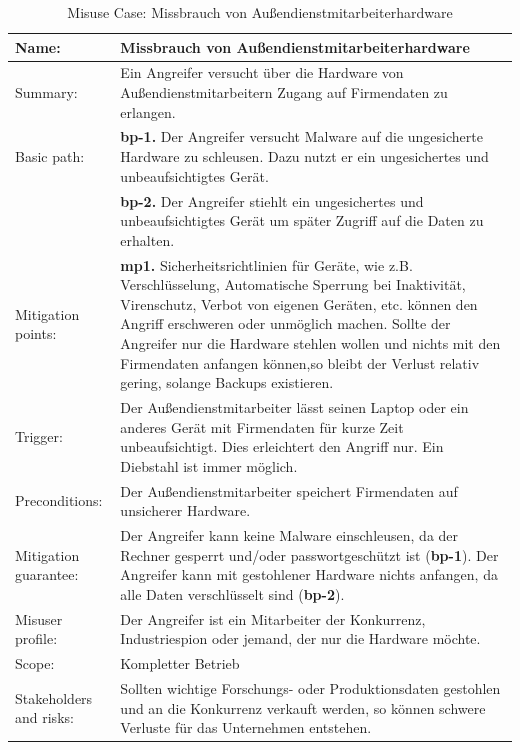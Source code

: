 \begin{table}[h]
\scriptsize
\centering
\caption{Misuse Case: Missbrauch von Außendienstmitarbeiterhardware}
\label{tab:MisuseCaseTemplate}
\begin{tabular}{p{}p{}}
\hline 
Name: & Missbrauch von Außendienstmitarbeiterhardware \\ 
\hline 
Summary: & Ein Angreifer versucht über die Hardware von Außendienstmitarbeitern Zugang auf Firmendaten zu erlangen.\\
\hline
Basic path: & \textbf{bp-1.} Der Angreifer versucht Malware auf die ungesicherte Hardware zu schleusen. Dazu nutzt er ein ungesichertes und unbeaufsichtigtes Gerät.\\
 & \textbf{bp-2.} Der Angreifer stiehlt ein ungesichertes und unbeaufsichtigtes Gerät um später Zugriff auf die Daten zu erhalten.\\ 
\hline 
Mitigation points: & \textbf{mp1.} Sicherheitsrichtlinien für Geräte, wie z.B. Verschlüsselung, Automatische Sperrung bei Inaktivität, Virenschutz, Verbot von eigenen Geräten, etc. können den Angriff erschweren oder unmöglich machen. Sollte der Angreifer nur die Hardware stehlen wollen und nichts mit den Firmendaten anfangen können,so bleibt der Verlust relativ gering, solange Backups existieren.\\ 
\hline 
Trigger: & Der Außendienstmitarbeiter lässt seinen Laptop oder ein anderes Gerät mit Firmendaten für kurze Zeit unbeaufsichtigt. Dies erleichtert den Angriff nur. Ein Diebstahl ist immer möglich.\\ 
\hline 
Preconditions: & Der Außendienstmitarbeiter speichert Firmendaten auf unsicherer Hardware.\\ 
\hline 
Mitigation guarantee: & Der Angreifer kann keine Malware einschleusen, da der Rechner gesperrt und/oder passwortgeschützt ist (\textbf{bp-1}). Der Angreifer kann mit gestohlener Hardware nichts anfangen, da alle Daten verschlüsselt sind (\textbf{bp-2}).\\ 
\hline 
Misuser profile: & Der Angreifer ist ein Mitarbeiter der Konkurrenz, Industriespion oder jemand, der nur die Hardware möchte. \\ 
\hline 
Scope: & Kompletter Betrieb \\ 
\hline 
Stakeholders and risks: & Sollten wichtige Forschungs- oder Produktionsdaten gestohlen und an die Konkurrenz verkauft werden, so können schwere Verluste für das Unternehmen entstehen. \\ 
\hline 
\end{tabular} 
\end{table}

